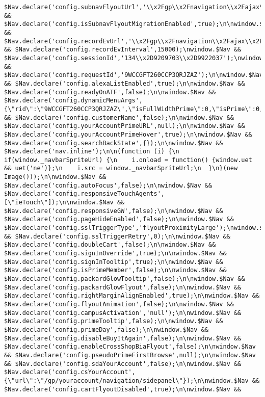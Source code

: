\documentclass[
]{article}
\begin{document}
\begin{verbatim}
$Nav.declare('config.subnavFlyoutUrl','\\x2Fgp\\x2Fnavigation\\x2Fajax\\x2Fgeneric.html');\nwindow.$Nav && $Nav.declare('config.isSubnavFlyoutMigrationEnabled',true);\n\nwindow.$Nav && $Nav.declare('config.recordEvUrl','\\x2Fgp\\x2Fnavigation\\x2Fajax\\x2Frecordevent.html');\nwindow.$Nav && $Nav.declare('config.recordEvInterval',15000);\nwindow.$Nav && $Nav.declare('config.sessionId','134\\x2D9209703\\x2D9922037');\nwindow.$Nav && $Nav.declare('config.requestId','9WCCGFT260CCP3QRJZAZ');\n\nwindow.$Nav && $Nav.declare('config.alexaListEnabled',true);\n\nwindow.$Nav && $Nav.declare('config.readyOnATF',false);\n\nwindow.$Nav && $Nav.declare('config.dynamicMenuArgs',{\"rid\":\"9WCCGFT260CCP3QRJZAZ\",\"isFullWidthPrime\":0,\"isPrime\":0,\"dynamicRequest\":1,\"weblabs\":\"\",\"isFreshRegionAndCustomer\":\"\",\"primeMenuWidth\":310});\n\nwindow.$Nav && $Nav.declare('config.customerName',false);\n\nwindow.$Nav && $Nav.declare('config.yourAccountPrimeURL',null);\n\nwindow.$Nav && $Nav.declare('config.yourAccountPrimeHover',true);\n\nwindow.$Nav && $Nav.declare('config.searchBackState',{});\n\nwindow.$Nav && $Nav.declare('nav.inline');\n\n(function (i) {\n  if(window._navbarSpriteUrl) {\n    i.onload = function() {window.uet && uet('ne')};\n    i.src = window._navbarSpriteUrl;\n  }\n}(new Image()));\n\nwindow.$Nav && $Nav.declare('config.autoFocus',false);\n\nwindow.$Nav && $Nav.declare('config.responsiveTouchAgents',[\"ieTouch\"]);\n\nwindow.$Nav && $Nav.declare('config.responsiveGW',false);\n\nwindow.$Nav && $Nav.declare('config.pageHideEnabled',false);\n\nwindow.$Nav && $Nav.declare('config.sslTriggerType','flyoutProximityLarge');\nwindow.$Nav && $Nav.declare('config.sslTriggerRetry',0);\n\nwindow.$Nav && $Nav.declare('config.doubleCart',false);\n\nwindow.$Nav && $Nav.declare('config.signInOverride',true);\n\nwindow.$Nav && $Nav.declare('config.signInTooltip',true);\n\nwindow.$Nav && $Nav.declare('config.isPrimeMember',false);\n\nwindow.$Nav && $Nav.declare('config.packardGlowTooltip',false);\n\nwindow.$Nav && $Nav.declare('config.packardGlowFlyout',false);\n\nwindow.$Nav && $Nav.declare('config.rightMarginAlignEnabled',true);\n\nwindow.$Nav && $Nav.declare('config.flyoutAnimation',false);\n\nwindow.$Nav && $Nav.declare('config.campusActivation','null');\n\nwindow.$Nav && $Nav.declare('config.primeTooltip',false);\n\nwindow.$Nav && $Nav.declare('config.primeDay',false);\n\nwindow.$Nav && $Nav.declare('config.disableBuyItAgain',false);\n\nwindow.$Nav && $Nav.declare('config.enableCrossShopBiaFlyout',false);\n\nwindow.$Nav && $Nav.declare('config.pseudoPrimeFirstBrowse',null);\n\nwindow.$Nav && $Nav.declare('config.sdaYourAccount',false);\n\nwindow.$Nav && $Nav.declare('config.csYourAccount',{\"url\":\"/gp/youraccount/navigation/sidepanel\"});\n\nwindow.$Nav && $Nav.declare('config.cartFlyoutDisabled',true);\n\nwindow.$Nav && 
\end{verbatim}
\end{document}
